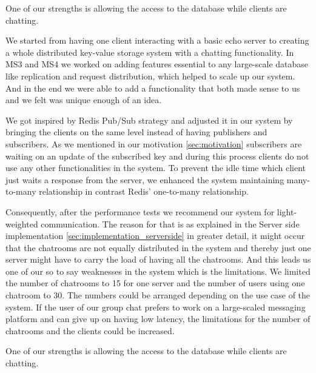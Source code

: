 One of our strengths is allowing the access to the database while clients are chatting.



We started from having one client interacting with a basic echo server to creating a whole distributed key-value storage system with a chatting functionality.
In MS3 and MS4 we worked on adding features essential to any large-scale database like replication and request distribution, which helped to scale up our system. 
And in the end we were able to add a functionality that both made sense to us and we felt was unique enough of an idea. 


We got inspired by Redis Pub/Sub strategy and adjusted it in our system by bringing the clients on the same level instead of having publishers and subscribers. As we mentioned in our motivation \ref{sec:motivation} subscribers are waiting on an update of the subscribed key and during this process clients do not use any other functionalities in the system. To prevent the idle time which client just waits a response from the server, we enhanced the system maintaining many-to-many relationship in contrast Redis’ one-to-many relationship.


Consequently, after the performance tests we recommend our system for light-weighted communication. The reason for that is as explained in the Server side implementation \ref{sec:implementation_serverside} in greater detail, it might occur that the chatrooms are not equally distributed in the system and thereby just one server might have to carry the load of having all the chatrooms. And this leads us one of our so to say weaknesses in the system which is the limitations. We limited the number of chatrooms to 15 for one server and the number of users using one chatroom to 30. The numbers could be arranged depending on the use case of the system. If the user of our group chat prefers to work on a large-scaled messaging platform and can give up on having low latency, the limitations for the number of chatrooms and the clients could be increased.

One of our strengths is allowing the access to the database while clients are chatting.